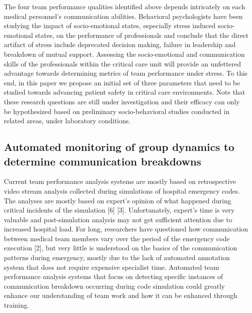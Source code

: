 \documentclass{article} %
\begin{document}
The four team performance qualities identified above depends intricately on each medical personnel's communication abilities.  Behavioral psychologists have been studying the impact of socio-emotional states, especially stress induced socio-emotional states, on the performance of professionals and conclude that the direct artifact of stress include deprecated decision making, failure in leadership and breakdown of mutual support. Assessing the socio-emotional and communication skills of the professionals within the critical care unit will provide an unfettered advantage towards determining metrics of team performance under stress. To this end, in this paper we propose an initial set of three parameters that need to be studied towards advancing patient safety in critical care environments. Note that these research questions are still under investigation and their efficacy can only be hypothesized based on preliminary socio-behavioral studies conducted in related areas, under laboratory conditions.

\vspace{-0.1in}
\subsection{Automated monitoring of group dynamics to determine communication breakdowns}
\vspace{-0.13in}
Current team performance analysis systems are mostly based on retrospective video stream analysis collected during simulations of hospital emergency codes. The analyses are mostly based on expert’s opinion of what happened during critical incidents of the simulation [6] [3]. Unfortunately, expert’s time is very valuable and post-simulation analysis may not get sufficient attention due to increased hospital load. For long, researchers have questioned how communication between medical team members vary over the period of the emergency code execution [2], but very little is understood on the basics of the communication patterns during emergency, mostly due to the lack of automated annotation system that does not require expensive specialist time. Automated team performance analysis systems that focus on detecting specific instances of communication breakdown occurring during code simulation could greatly enhance our understanding of team work and how it can be enhanced through training. 

\vspace{-0.1in}
\end{document}
